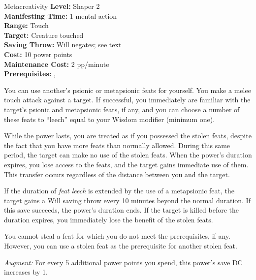 {Metacreativity}
{
	\textbf{Level:}
	Shaper 2\\
	\textbf{Manifesting Time:}
	1 mental action\\
	\textbf{Range:}
	Touch\\
	\textbf{Target:}
	Creature touched\\
	\textbf{Saving Throw:}
	Will negates; see text\\
	\textbf{Cost:}
	10 power points\\
	\textbf{Maintenance Cost:}
	2 pp/minute\\
	\textbf{Prerequisites:}
	, \\
}
{
	You can use another's psionic or metapsionic feats for yourself. You make a melee touch attack against a target. If successful, you immediately are familiar with the target's psionic and metapsionic feats, if any, and you can choose a number of these feats to ``leech'' equal to your Wisdom modifier (minimum one).

	While the power lasts, you are treated as if you possessed the stolen feats, despite the fact that you have more feats than normally allowed. During this same period, the target can make no use of the stolen feats. When the power's duration expires, you lose access to the feats, and the target gains immediate use of them. This transfer occurs regardless of the distance between you and the target.

	If the duration of \emph{feat leech} is extended by the use of a metapsionic feat, the target gains a Will saving throw every 10 minutes beyond the normal duration. If this save succeeds, the power's duration ends. If the target is killed before the duration expires, you immediately lose the benefit of the stolen feats.

	You cannot steal a feat for which you do not meet the prerequisites, if any. However, you can use a stolen feat as the prerequisite for another stolen feat.

	\textit{Augment:} For every 5 additional power points you spend, this power's save DC increases by 1.
}
